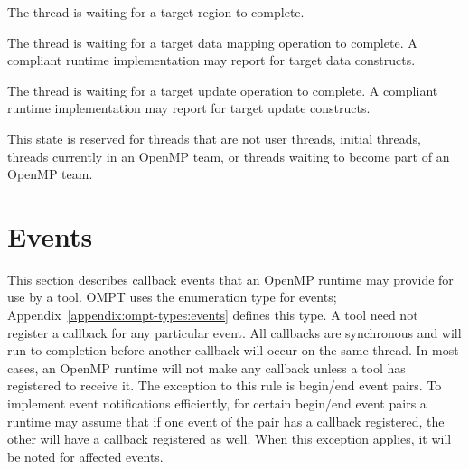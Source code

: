 \documentclass{article}
\newcommand{\descheader}[1]{{\needspace{3\baselineskip}\vspace{1em}\noindent \fbox{#1}}}
\begin{document}
\begin{description}

\item {} 

  The thread is waiting for a target region to complete.
  
\item {} 

  The thread is waiting for a target data mapping operation to complete. 
  A  compliant runtime implementation may report  for target data constructs.

\item {} 

  The thread is waiting for a target  update operation to complete. 
  A  compliant runtime implementation may report  for target update constructs.

\end{description}

\descheader{Undefined}

\begin{description}

\item {} 

  This state is reserved for threads that are not user threads,
  initial threads, threads currently in an OpenMP team, or threads
  waiting to become part of an OpenMP team.

\end{description}

\section{Events}
\label{sec:events} 

This section describes callback events that an OpenMP runtime 
may provide for use by a tool. OMPT uses the enumeration type  for events; 
Appendix~\ref{appendix:ompt-types:events} defines this type. 
A tool need not register a callback for any particular event.
All callbacks are synchronous and will run to completion before another callback will occur on the same thread.
In most cases, an OpenMP runtime will not make any callback unless a  tool has registered to receive it. The exception to this rule is begin/end event pairs. 
To implement event notifications efficiently, for certain begin/end event pairs a runtime may assume that if one event of the pair has a callback registered, the other will have a callback registered as well. When this exception applies, it will be noted for affected events.
\end{document}
